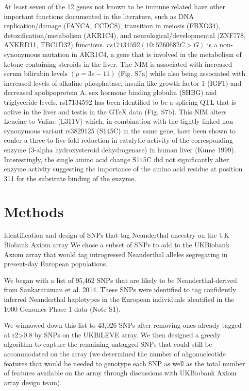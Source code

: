 At least seven of the 12 genes not known to be immune related have other important functions documented in the literature, such as DNA replication/damage (FANCA, CCDC8), transition in meiosis (FBXO34), detoxification/metabolism (AKR1C4), and neurological/developmental (ZNF778, ANKRD11, TBC1D32) functions. $rs17134592 (10:5260682 C>G)$ is a non-synonymous mutation in AKR1C4, a gene that is involved in the metabolism of ketone-containing steroids in the liver. The NIM is associated with increased serum bilirubin levels $(p = 3e-11)$  (Fig. S7a) while also being associated with increased levels of alkaline phosphatase, insulin-like growth factor 1 (IGF1) and decreased apolipoprotein A, sex hormone binding globulin (SHBG) and triglyceride levels.  rs17134592 has been identified to be a splicing QTL that is active in the liver and testis in the GTeX data (Fig. S7b). This NIM alters Leucine to Valine (L311V) which, in combination with the tightly-linked non-synonymous variant rs3829125 (S145C) in the same gene, have been shown to confer a three-to-five-fold reduction in catalytic activity of the corresponding enzyme (3-alpha hydroxysteroid dehydrogenase) in human liver (Kume 1999). Interestingly, the single amino acid change S145C did not significantly alter enzyme activity suggesting the importance of the amino acid residue at position 311 for the substrate binding of the enzyme.
\section{Methods}
Identification and design of SNPs that tag Neanderthal ancestry on the UK Biobank Axiom array 
We chose a subset of SNPs to add to the UKBiobank Axiom array that would tag introgressed Neanderthal alleles segregating in present-day European populations.
 
We began with a list of 95,462 SNPs that are likely to be Neanderthal-derived from Sankararaman et al. 2014. These SNPs were identified to tag confidently inferred Neanderthal haplotypes in the European individuals identified in the 1000 Genomes Phase 1 data (Note S1).

We winnowed down this list to 43,026 SNPs after removing ones already tagged at r2>0.8 by SNPs on the UKBiLEVE array. We then designed a greedy algorithm to capture the remaining untagged SNPs that could still be accommodated on the array (we determined the number of oligonucleotide features that would be needed to genotype each SNP as well as the total number of features available on the array through discussions with UKBiobank Axiom array design team).

